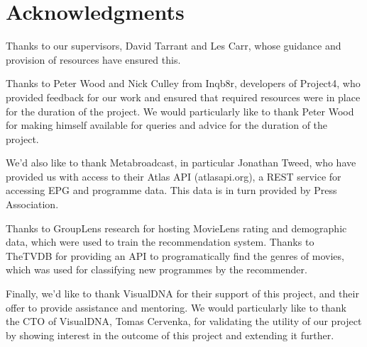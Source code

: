 \section{Acknowledgments}

Thanks to our supervisors, David Tarrant and Les Carr, whose guidance and provision of resources have ensured this.

Thanks to Peter Wood and Nick Culley from Inqb8r, developers of Project4, who provided feedback for our work and ensured that required resources were in place for the duration of the project. We would particularly like to thank Peter Wood for making himself available for queries and advice for the duration of the project.

We'd also like to thank Metabroadcast, in particular Jonathan Tweed, who have provided us with access to their Atlas API (atlasapi.org), a REST service for accessing EPG and programme data. This data is in turn provided by Press Association.

Thanks to GroupLens research for hosting MovieLens rating and demographic data, which were used to train the recommendation system. Thanks to TheTVDB for providing an API to programatically find the genres of movies, which was used for classifying new programmes by the recommender.

Finally, we'd like to thank VisualDNA for their support of this project, and their offer to provide assistance and mentoring. We would particularly like to thank the CTO of VisualDNA, Tomas Cervenka, for validating the utility of our project by showing interest in the outcome of this project and extending it further.

\cleardoublepage
\setcounter{tocdepth}{2}

\begin{comment}
	\tableofcontents
	\newpage
	\cleardoublepage
	\setcounter{page}{0}
	\pagenumbering{arabic}
	\cleardoublepage
\end{comment}

